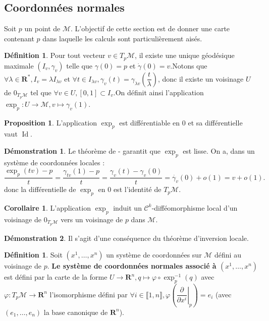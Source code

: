 \documentclass[12pt,a4paper]{article}
\DeclareMathOperator{\Id}{Id}
\theoremstyle{definition}
\newtheorem{prop}[thm]{Proposition}
\newtheorem{defn}[thm]{Définition}
\newtheorem*{dem}{Démonstration}
\newtheorem{cor}[thm]{Corollaire}
\begin{document}
\subsection{Coordonnées normales}
Soit $p$ un point de $\mathcal{M}$.  L'objectif de cette section est de donner une carte contenant $p$ dans laquelle les calculs sont particulièrement aisés.
\begin{defn}
Pour tout vecteur $v\in T_p\mathcal{M}$, il existe une unique géodésique maximale $(I_v,\gamma_v)$ telle que $\gamma(0)=p$ et $\dot{\gamma}(0)=v$.\newline Notons que $\forall\lambda\in\mathbf{R}^*, I_v=\lambda I_{\lambda v}$ et $\forall t\in I_{\lambda v}, \gamma_{ v}(t)=\gamma_{\lambda v}\left(\dfrac{t}{\lambda}\right)$, donc il existe un voisinage $U$ de $0_{T_p\mathcal{M}}$ tel que $\forall v\in U, [0,1]\subset I_v$.\newline On définit ainsi l'application $\exp_p:U\to\mathcal{M},v\mapsto\gamma_v(1)$.
\end{defn}
\begin{prop}
L'application $\exp_p$ est différentiable en $0$ et sa différentielle vaut $\Id$.
\end{prop}
\begin{dem}
Le théorème de - garantit que $\exp_p$ est lisse.\newline
On a, dans un système de coordonnées locales :
$$
\dfrac{\exp_p(tv)-p}{t}=\dfrac{\gamma_{tv}(1)-p}{t}=\dfrac{\gamma_v(t)-\gamma_v(0)}{t}=\dot{\gamma_v}(0)+o(1)=v+o(1).
$$
donc la différentielle de $\exp_p$ en $0$ est l'identité de $T_p\mathcal{M}$.
\end{dem}
\begin{cor}
L'application $\exp_p$ induit un $\mathcal{C}^k$-difféomorphisme local d'un voisinage de $0_{T_p\mathcal{M}}$ vers un voisinage de $p$ dans $\mathcal{M}$.
\end{cor}
\begin{dem}
Il s'agit d'une conséquence du théorème d'inversion locale.
\end{dem}
\begin{defn}
Soit $(x^1,\ldots,x^n)$ un système de coordonnées sur $\mathcal{M}$ défini au voisinage de $p$.
\textbf{Le système de coordonnées normales associé à $(x^1,\ldots,x^n)$} est défini par la carte de la forme $U\to\mathbf{R}^n,q\mapsto \varphi\circ\exp_p^{-1}(q)$ avec $\varphi:T_p\mathcal{M}\to\mathbf{R}^n$ l'isomorphisme défini par $\forall i\in\llbracket 1,n\rrbracket,\varphi\left(\left.\dfrac{\partial}{\partial x^i}\right|_{p}\right)=e_i$ (avec $(e_1,\ldots,e_n)$ la base canonique de $\mathbf{R}^n$).
\end{defn}
\end{document}
